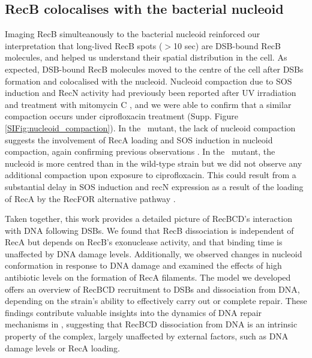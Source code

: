 \subsection*{RecB colocalises with the bacterial nucleoid}
Imaging RecB simulteanously to the bacterial nucleoid reinforced our interpretation that long-lived RecB spots ($>$10 sec) are DSB-bound RecB molecules, and helped us understand their spatial distribution in the cell. As expected, DSB-bound RecB molecules moved to the centre of the cell after DSBs formation and colocalised with the nucleoid. Nucleoid compaction due to SOS induction and RecN activity had previously been reported after UV irradiation and treatment with mitomycin C \cite{Odsbu2014,Vickridge2017}, and we were able to confirm that a similar compaction occurs under ciprofloxacin treatment (Supp. Figure \ref{SIFig:nucleoid_compaction}). In the \dreca\ mutant, the lack of nucleoid compaction suggests the involvement of RecA loading and SOS induction in nucleoid compaction, again confirming previous observations \cite{Odsbu2014,Vickridge2017}. In the \geneteneighty\ mutant, the nucleoid is more centred than in the wild-type strain but we did not observe any additional compaction upon exposure to ciprofloxacin. This could result from a substantial delay in SOS induction and recN expression as a result of the loading of RecA by the RecFOR alternative pathway \cite{Lepore2025}.

Taken together, this work provides a detailed picture of RecBCD's interaction with DNA following DSBs. We found that RecB dissociation is independent of RecA but depends on RecB's exonuclease activity, and that binding time is unaffected by DNA damage levels. Additionally, we observed changes in nucleoid conformation in response to DNA damage and examined the effects of high antibiotic levels on the formation of RecA filaments. The model we developed offers an overview of RecBCD recruitment to DSBs and dissociation from DNA, depending on the strain's ability to effectively carry out or complete repair.
These findings contribute valuable insights into the dynamics of DNA repair mechanisms in \ecoli, suggesting that RecBCD dissociation from DNA is an intrinsic property of the complex, largely unaffected by external factors, such as DNA damage levels or RecA loading.